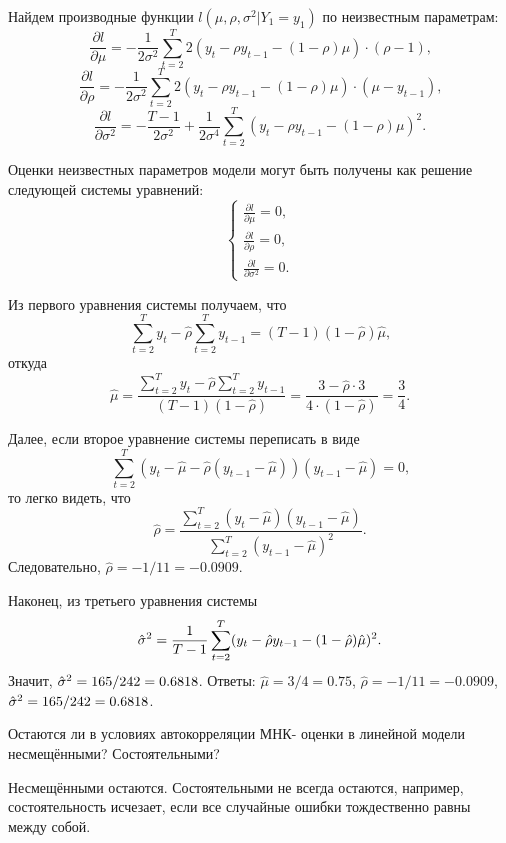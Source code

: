 \begin{problem}
\begin{sol}
Найдем производные функции $l(\mu, \rho, \sigma^2|Y_1 = y_1)$ по неизвестным параметрам:
\[
\frac{\partial l}{\partial \mu} = -\frac{1}{2\sigma^2} \sum_{t=2}^{T} 2(y_t - \rho y_{t-1} - (1 - \rho) \mu) \cdot (\rho - 1) \text{,}
\]
\[
\frac{\partial l}{\partial \rho} = -\frac{1}{2\sigma^2} \sum_{t=2}^{T} 2(y_t - \rho y_{t-1} - (1 - \rho) \mu) \cdot (\mu - y_{t-1}) \text{,}
\]
\[
\frac{\partial l}{\partial {\sigma^2}} =  - \frac{T-1}{2\sigma^2} + \frac{1}{2\sigma^4} \sum_{t=2}^{T}(y_t - \rho y_{t-1} - (1 - \rho) \mu)^2 \text{.}
\]

Оценки неизвестных параметров модели могут быть получены как решение следующей системы уравнений:
\[
\left\{
  \begin{aligned}
    \frac{\partial l}{\partial \mu} = 0 \text{,} \\
    \frac{\partial l}{\partial \rho} = 0 \text{,} \\
    \frac{\partial l}{\partial {\sigma^2}} = 0 \text{.}
  \end{aligned}
\right.
\]

Из первого уравнения системы получаем, что
\[
\sum_{t=2}^{T}y_{t} - \hat{\rho} \sum_{t=2}^{T}y_{t-1} = (T - 1) (1- \hat{\rho}) \hat{\mu} \text{,}
\]
откуда
\[
\hat{\mu} = \frac{\sum_{t=2}^{T}y_{t} - \hat{\rho} \sum_{t=2}^{T}y_{t-1}}{(T - 1) (1- \hat{\rho})} = \frac{3 - \hat{\rho} \cdot 3}{4\cdot(1-\hat{\rho})} = \frac{3}{4} \text{.}
\]

Далее, если второе уравнение системы переписать в виде
\[
\sum_{t=2}^{T}(y_t - \hat{\mu} - \hat{\rho} (y_{t-1} - \hat{\mu}))(y_{t-1} - \hat{\mu}) = 0 \text{,}
\]
то легко видеть, что
\[
\hat{\rho} = \frac{\sum_{t=2}^{T}(y_t - \hat{\mu})(y_{t-1} - \hat{\mu})}{\sum_{t=2}^{T}(y_{t-1} - \hat{\mu})^2} \text{.}
\]
Следовательно, $\hat{\rho} =-1/11= -0.0909$.

Наконец, из третьего уравнения системы
\[
\hat{\sigma}^2 =\frac{1}{T-1} \sum_{t=2}^{T}(y_t - \hat{\rho} y_{t-1} - (1 - \hat{\rho}) \hat{\mu})^2 \text{.}
\]
Значит, $\hat{\sigma}^2 = 165/242= 0.6818$. Ответы: $\hat{\mu} = 3/4= 0.75$, $\hat{\rho} = -1/11=-0.0909$, $\hat{\sigma}^2 =165/242=0.6818$.
\end{sol}
\end{problem}




\begin{problem}
Остаются ли в условиях автокорреляции МНК-
оценки в линейной модели несмещёнными? Состоятельными?
\begin{sol}
Несмещёнными остаются. Состоятельными не всегда остаются, например, состоятельность исчезает, если все случайные ошибки тождественно равны между собой.

\end{sol}
\end{problem}



